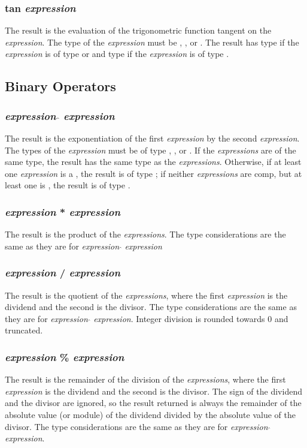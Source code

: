\subsubsection{tan \textit{expression}}
The result is the evaluation of the trigonometric function tangent on the \textit{expression}. The type of the \textit{expression} must be \integ, \float, or  \complex. The result has type \float if the \textit{expression} is of type \integ or \float and type \complex if the \textit{expression} is of type  \complex. 
\subsection{Binary Operators}
\subsubsection{\textit{expression} $\hat{}$ \textit{expression}}
The result is the exponentiation of the first \textit{expression} by the second \textit{expression}. The types of the \textit{expression} must be of type \integ, \float, or  \complex. If the \textit{expressions} are of the same type, the result has the same type as the \textit{expressions}. Otherwise, if at least one \textit{expression} is a \complex, the result is of type \complex; if neither \textit{expressions} are comp, but at least one is \float, the result is of type \float.
\subsubsection{\textit{expression} * \textit{expression}}
The result is the product of the \textit{expressions}. The type considerations are the same as they are for \textit{expression} $\hat{}$ \textit{expression}
\subsubsection{\textit{expression} / \textit{expression}}
The result is the quotient of the \textit{expressions}, where the first \textit{expression} is the dividend and the second is the divisor. The type considerations are the same as they are for \textit{expression} $\hat{}$ \textit{expression}. Integer division is rounded towards 0 and truncated. 
\subsubsection{\textit{expression} \% \textit{expression}}
The result is the remainder of the division of the \textit{expressions}, where the first \textit{expression} is the dividend and the second is the divisor. The sign of the dividend and the divisor are ignored, so the result returned is always the remainder of the absolute value (or module) of the dividend divided by the absolute value of the divisor. The type considerations are the same as they are for \textit{expression} $\hat{}$ \textit{expression}.
